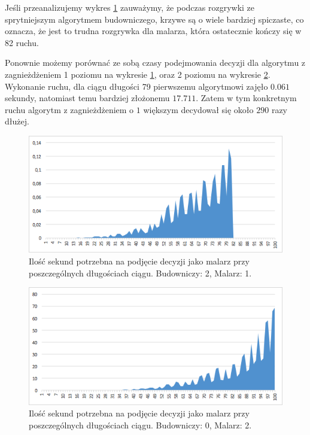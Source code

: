 \documentclass[document]{xmgr}
\begin{document}
Jeśli przeanalizujemy wykres \ref{fig:painter1builder2} zauważymy, że podczas rozgrywki ze sprytniejszym algorytmem budowniczego, krzywe są o wiele bardziej spiczaste, co oznacza, że jest to trudna rozgrywka dla malarza, która ostatecznie kończy się w 82 ruchu.

Ponownie możemy porównać ze sobą czasy podejmowania decyzji dla algorytmu z zagnieżdżeniem 1 poziomu na wykresie \ref{fig:painter1builder2}, oraz 2 poziomu na wykresie \ref{fig:painter2builder0}. Wykonanie ruchu, dla ciągu długości 79 pierwszemu algorytmowi zajęło $0.061$ sekundy, natomiast temu bardziej złożonemu $17.711$. Zatem w tym konkretnym ruchu algorytm z zagnieżdżeniem o $1$ większym decydował się około $290$ razy dłużej.

\begin{figure}[h]
    \centering
    \includegraphics[scale = 0.7]{images/timePainter1Builder2}
    \caption{Ilość sekund potrzebna na podjęcie decyzji jako malarz przy poszczególnych długościach ciągu. Budowniczy: 2, Malarz: 1.}
    \label{fig:painter1builder2}
\end{figure}

\begin{figure}[h]
    \centering
    \includegraphics[scale = 0.7]{images/timePainter2Builder0}
    \caption{Ilość sekund potrzebna na podjęcie decyzji jako malarz przy poszczególnych długościach ciągu. Budowniczy: 0, Malarz: 2.}
    \label{fig:painter2builder0}
\end{figure}
\end{document}
